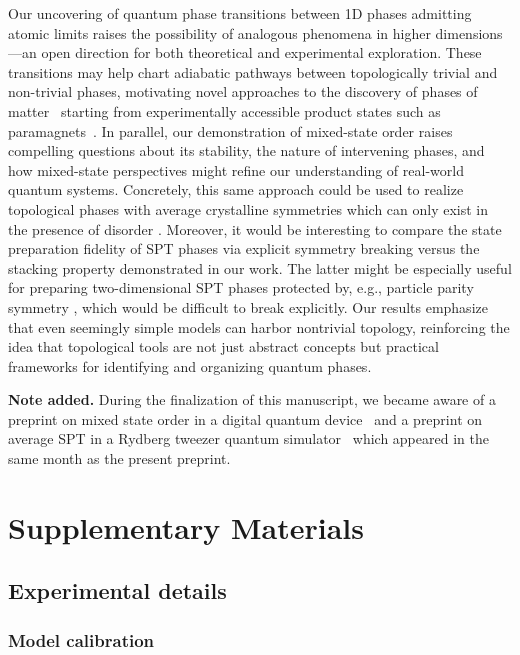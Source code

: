\documentclass[preprint,superscriptaddress,floatfix, nofootinbib]{revtex4-2}
\begin{document}
Our uncovering of quantum phase transitions between 1D phases admitting atomic limits raises the possibility of analogous phenomena in higher dimensions---an open direction for both theoretical and experimental exploration. These transitions may help chart adiabatic pathways between topologically trivial and non-trivial phases, motivating novel approaches to the discovery of phases of matter~\cite{Semeghini2021} starting from experimentally accessible product states such as paramagnets~\cite{Scholl2021, Ebadi2021}. In parallel, our demonstration of mixed-state order raises compelling questions about its stability, the nature of intervening phases, and how mixed-state perspectives might refine our understanding of real-world quantum systems. Concretely, this same approach could be used to realize topological phases with average crystalline symmetries which can only exist in the presence of disorder \cite{Ma23_b,intrinsicACSPT}. Moreover, it would be interesting to compare the state preparation fidelity of SPT phases via explicit symmetry breaking versus the stacking property demonstrated in our work. The latter might be especially useful for preparing two-dimensional SPT phases protected by, e.g., particle parity symmetry \cite{LevinGu}, which would be difficult to break explicitly.
Our results emphasize that even seemingly simple models can harbor nontrivial topology, reinforcing the idea that topological tools are not just abstract concepts but practical frameworks for identifying and organizing quantum phases.

\vspace{4pt}

\textbf{Note added.} During the finalization of this manuscript, we became aware of a preprint on mixed state order in a digital quantum device~\cite{Zhang2025} and a preprint on average SPT in a Rydberg tweezer quantum simulator~\cite{Yue2025} which appeared in the same month as the present preprint.

\section*{Supplementary Materials}

\subsection*{Experimental details}

\subsubsection*{Model calibration}
\end{document}

